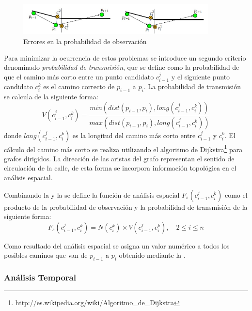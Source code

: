 \begin{figure}[h*]
	\centering
	\includegraphics[width=0.9\textwidth]{capitulos/6/figuras/figura7.jpg}
	\caption{\label{fig:probabilidad_transmision} Errores en la probabilidad de observación}	
\end{figure}

Para minimizar la ocurrencia de estos problemas se introduce un segundo criterio denominado \emph{probabilidad de transmisión}, que se define como la probabilidad de que el camino más corto entre un punto candidato $c_{i-1}^{j}$ y el siguiente punto candidato $c_{i}^{k}$ es el camino correcto de $p_{i-1}$ a $p_i$. La probabilidad de transmisión se calcula de la siguiente forma: 
\begin{equation} \label{probabilidad_de_transmision}
V(c_{i-1}^{j}, c_{i}^{k}) = \frac { min( dist(p_{i-1}, p_i), long(c_{i-1}^{j}, c_{i}^{k})) }{ max (dist(p_{i-1}, p_i), long(c_{i-1}^{j}, c_{i}^{k})) }
\end{equation}
donde $long(c_{i-1}^{j}, c_{i}^{k})$ es la longitud del camino más corto entre $c_{i-1}^{j}$ y $c_{i}^{k}$. El cálculo del camino más corto se realiza utilizando el algoritmo de Dijkstra\footnote{http://es.wikipedia.org/wiki/Algoritmo\_de\_Dijkstra} para grafos dirigidos. La dirección de las aristas del grafo representan el sentido de circulación de la calle, de esta forma se incorpora información topológica en el análisis espacial. 

Combinando la  y la  se define la función de análisis espacial $F_s(c_{i-1}^{j},c_{i}^{k})$ como el producto de la probabilidad de observación y la probabilidad de transmisión de la siguiente forma:
\begin{equation} \label{funcion_espacial}
F_s(c_{i-1}^{j},c_{i}^{k}) = N(c_{i}^{k}) \times V(c_{i-1}^{j}, c_{i}^{k}), \quad 2 \le i \le n 
\end{equation}

Como resultado del análisis espacial se asigna un valor numérico a todos los posibles caminos que van de $p_{i-1}$ a $p_i$ obtenido mediante la .

\subsubsection{Análisis Temporal}

